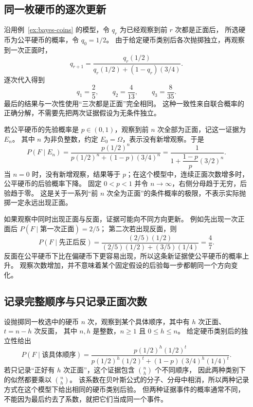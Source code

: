 \documentclass[UTF8,12pt,a4paper,fontset=fandol]{ctexart}
\begin{document}
\subsection{同一枚硬币的逐次更新}

沿用例~\ref{ex:bayes-coins} 的模型，令 $q_r$ 为已经观察到前 $r$ 次都是正面后，
所选硬币为公平硬币的概率，令 $q_0=1/2$。
由于给定硬币类别后各次抛掷独立，再观察到一次正面时，
\begin{equation}
  q_{r+1}=\frac{q_r(1/2)}{q_r(1/2)+(1-q_r)(3/4)}.
  \label{eq:bayes-coin-recursion}
\end{equation}
逐次代入得到
\[
  q_1=\frac25,\qquad q_2=\frac4{13},\qquad q_3=\frac8{35}.
\]
最后的结果与一次性使用“三次都是正面”完全相同。
这种一致性来自联合概率的正确分解，不需要先把两次证据假设为无条件独立。

若公平硬币的先验概率是 $p\in(0,1)$，观察到前 $n$ 次全部为正面，记这一证据为 $E_n$。
其中 $n$ 为非负整数，约定 $E_0=\Omega$，表示没有新增观察。于是
\begin{equation}
  P(F\mid E_n)
  =\frac{p(1/2)^n}{p(1/2)^n+(1-p)(3/4)^n}
  =\frac{1}{1+\dfrac{1-p}{p}(3/2)^n}.
  \label{eq:bayes-coin-heads}
\end{equation}
当 $n=0$ 时，没有新增观察，结果等于 $p$；在这个模型中，连续正面次数增多时，公平硬币的后验概率下降。
固定 $0<p<1$ 并令 $n\to\infty$，右侧分母趋于无穷，后验趋于零。
这是关于一系列“前 $n$ 次全为正面”的条件概率的极限，不表示实际抛掷一定永远出现正面。

如果观察中同时出现正面与反面，证据可能向不同方向更新。
例如先出现一次正面后 $P(F\mid\text{第一次正面})=2/5$；
第二次若出现反面，则
\[
  P(F\mid\text{先正后反})
  =\frac{(2/5)(1/2)}{(2/5)(1/2)+(3/5)(1/4)}=\frac47.
\]
反面在公平硬币下比在偏硬币下更容易出现，所以这条新证据使公平硬币的概率上升。
观察次数增加，并不意味着某个固定假设的后验每一步都朝同一个方向变化。

\subsection{记录完整顺序与只记录正面次数}

设抛掷同一枚选中的硬币 $n$ 次，观察到某个具体顺序，其中有 $h$ 次正面、$t=n-h$ 次反面，
其中 $n,h$ 是整数，$n\geq1$ 且 $0\leq h\leq n$。
给定硬币类别后的独立性给出
\begin{equation}
  P(F\mid\text{该具体顺序})
  =\frac{p(1/2)^h(1/2)^t}
  {p(1/2)^h(1/2)^t+(1-p)(3/4)^h(1/4)^t}.
  \label{eq:bayes-coin-sequence}
\end{equation}
若只记录“正好有 $h$ 次正面”，这个证据包含 $\binom nh$ 个不同顺序，
因此两种类别下的似然都要乘以 $\binom nh$。
该系数在贝叶斯公式的分子、分母中相消，所以两种记录方式在这个模型下给出相同的硬币类别后验。
但两种证据事件的概率通常不同，不能因为最后约去了系数，就把它们当成同一个事件。
\end{document}
